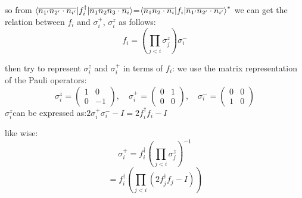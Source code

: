 \documentclass[12pt]{article}
\begin{document}
so from $\braket{\overline{n_{1'}n_{2'}\cdot n_{i'}}|f_i^\dagger|\overline{n_1n_2n_3\cdot n_i}}$=$\braket{\overline{n_{1}n_{2}\cdot n_{i}}|f_i|\overline{n_{1'}n_{2'}\cdot n_{i'}}}^*$
we can get the relation between $f_i$ and $\sigma_i^+$, $\sigma_i^z$ as follows:
\[
f_i = \left( \prod_{j<i} \sigma_j^z \right) \sigma_i^-
\]

then try to represent $\sigma_i^z$ and $\sigma_i^+$ in terms of $f_i$:
we use the matrix representation of the Pauli operators:
\[
\sigma_i^z = \begin{pmatrix}
1 & 0 \\
0 & -1
\end{pmatrix}, \quad \sigma_i^+ = \begin{pmatrix}
0 & 1 \\
0 & 0
\end{pmatrix}, \quad \sigma_i^- = \begin{pmatrix}
0 & 0 \\
1 & 0
\end{pmatrix}
\]
$\sigma_i^z  $can be expressed as:$  2\sigma_i^+\sigma_i^- -I = 2f_i^{\dagger} f_i-I$


like wise:
\[
\sigma_i^+ = f_i^{\dagger} \left( \prod_{j<i} \sigma_j^z \right)^{-1}
\]
\[
= f_i^{\dagger} \left( \prod_{j<i} (2f_j^{\dagger} f_j - I) \right)
\]
\end{document}
